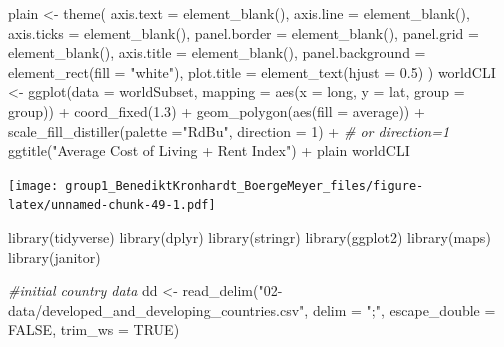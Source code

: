 \documentclass[
  11pt,
  a4paper,
  twoside]{scrbook}
\newenvironment{Shaded}{\begin{snugshade}}{\end{snugshade}}
\newcommand{\AttributeTok}[1]{\textcolor[rgb]{0.77,0.63,0.00}{#1}}
\newcommand{\CommentTok}[1]{\textcolor[rgb]{0.56,0.35,0.01}{\textit{#1}}}
\newcommand{\ConstantTok}[1]{\textcolor[rgb]{0.00,0.00,0.00}{#1}}
\newcommand{\DecValTok}[1]{\textcolor[rgb]{0.00,0.00,0.81}{#1}}
\newcommand{\FloatTok}[1]{\textcolor[rgb]{0.00,0.00,0.81}{#1}}
\newcommand{\FunctionTok}[1]{\textcolor[rgb]{0.00,0.00,0.00}{#1}}
\newcommand{\NormalTok}[1]{#1}
\newcommand{\OtherTok}[1]{\textcolor[rgb]{0.56,0.35,0.01}{#1}}
\newcommand{\SpecialCharTok}[1]{\textcolor[rgb]{0.00,0.00,0.00}{#1}}
\newcommand{\StringTok}[1]{\textcolor[rgb]{0.31,0.60,0.02}{#1}}
\begin{document}
\linespread{1}

\begin{Shaded}
\begin{Highlighting}[]

\NormalTok{plain }\OtherTok{\textless{}{-}} \FunctionTok{theme}\NormalTok{(}
  \AttributeTok{axis.text =} \FunctionTok{element\_blank}\NormalTok{(),}
  \AttributeTok{axis.line =} \FunctionTok{element\_blank}\NormalTok{(),}
  \AttributeTok{axis.ticks =} \FunctionTok{element\_blank}\NormalTok{(),}
  \AttributeTok{panel.border =} \FunctionTok{element\_blank}\NormalTok{(),}
  \AttributeTok{panel.grid =} \FunctionTok{element\_blank}\NormalTok{(),}
  \AttributeTok{axis.title =} \FunctionTok{element\_blank}\NormalTok{(),}
  \AttributeTok{panel.background =} \FunctionTok{element\_rect}\NormalTok{(}\AttributeTok{fill =} \StringTok{"white"}\NormalTok{),}
  \AttributeTok{plot.title =} \FunctionTok{element\_text}\NormalTok{(}\AttributeTok{hjust =} \FloatTok{0.5}\NormalTok{)}
\NormalTok{)}
\NormalTok{worldCLI }\OtherTok{\textless{}{-}} \FunctionTok{ggplot}\NormalTok{(}\AttributeTok{data =}\NormalTok{ worldSubset, }\AttributeTok{mapping =} \FunctionTok{aes}\NormalTok{(}\AttributeTok{x =}\NormalTok{ long, }\AttributeTok{y =}\NormalTok{ lat, }\AttributeTok{group =}\NormalTok{ group)) }\SpecialCharTok{+} 
  \FunctionTok{coord\_fixed}\NormalTok{(}\FloatTok{1.3}\NormalTok{) }\SpecialCharTok{+}
  \FunctionTok{geom\_polygon}\NormalTok{(}\FunctionTok{aes}\NormalTok{(}\AttributeTok{fill =}\NormalTok{ average)) }\SpecialCharTok{+}
  \FunctionTok{scale\_fill\_distiller}\NormalTok{(}\AttributeTok{palette =}\StringTok{"RdBu"}\NormalTok{, }\AttributeTok{direction =} \DecValTok{1}\NormalTok{) }\SpecialCharTok{+} \CommentTok{\# or direction=1}
  \FunctionTok{ggtitle}\NormalTok{(}\StringTok{"Average Cost of Living + Rent Index"}\NormalTok{) }\SpecialCharTok{+}
\NormalTok{  plain}
\NormalTok{worldCLI}
\end{Highlighting}
\end{Shaded}

\linespread{1}\texttt{[image: group1\_BenediktKronhardt\_BoergeMeyer\_files/figure-latex/unnamed-chunk-49-1.pdf]}

\linespread{1}

\begin{Shaded}
\begin{Highlighting}[]
\FunctionTok{library}\NormalTok{(tidyverse)}
\FunctionTok{library}\NormalTok{(dplyr)}
\FunctionTok{library}\NormalTok{(stringr)}
\FunctionTok{library}\NormalTok{(ggplot2)}
\FunctionTok{library}\NormalTok{(maps)}
\FunctionTok{library}\NormalTok{(janitor)}

\CommentTok{\#initial country data}
\NormalTok{dd }\OtherTok{\textless{}{-}} \FunctionTok{read\_delim}\NormalTok{(}\StringTok{"02{-}data/developed\_and\_developing\_countries.csv"}\NormalTok{, }
                                  \AttributeTok{delim =} \StringTok{";"}\NormalTok{, }\AttributeTok{escape\_double =} \ConstantTok{FALSE}\NormalTok{,}
                                  \AttributeTok{trim\_ws =} \ConstantTok{TRUE}\NormalTok{)}
\end{Highlighting}
\end{Shaded}
\end{document}
